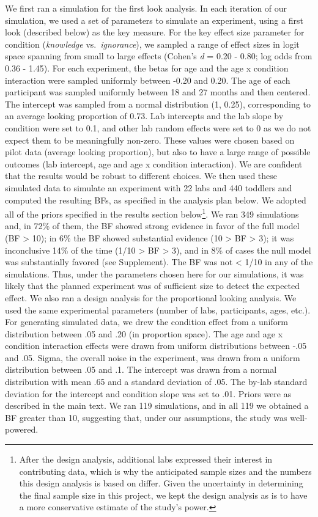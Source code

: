 \documentclass[
  man,floatsintext]{apa6}
\begin{document}
We first ran a simulation for the first look analysis. In each iteration of our simulation, we used a set of parameters to simulate an experiment, using a first look (described below) as the key measure. For the key effect size parameter for condition (\emph{knowledge} vs.~\emph{ignorance}), we sampled a range of effect sizes in logit space spanning from small to large effects (Cohen's \emph{d} = 0.20 - 0.80; log odds from 0.36 - 1.45). For each experiment, the betas for age and the age x condition interaction were sampled uniformly between -0.20 and 0.20. The age of each participant was sampled uniformly between 18 and 27 months and then centered. The intercept was sampled from a normal distribution (1, 0.25), corresponding to an average looking proportion of 0.73. Lab intercepts and the lab slope by condition were set to 0.1, and other lab random effects were set to 0 as we do not expect them to be meaningfully non-zero. These values were chosen based on pilot data (average looking proportion), but also to have a large range of possible outcomes (lab intercept, age and age x condition interaction). We are confident that the results would be robust to different choices. We then used these simulated data to simulate an experiment with 22 labs and 440 toddlers and computed the resulting BFs, as specified in the analysis plan below. We adopted all of the priors specified in the results section below\footnote{After the design analysis, additional labs expressed their interest in contributing data, which is why the anticipated sample sizes and the numbers this design analysis is based on differ. Given the uncertainty in determining the final sample size in this project, we kept the design analysis as is to have a more conservative estimate of the study's power.}. We ran 349 simulations and, in 72\% of them, the BF showed strong evidence in favor of the full model (BF \textgreater{} 10); in 6\% the BF showed substantial evidence (10 \textgreater{} BF \textgreater{} 3); it was inconclusive 14\% of the time (1/10 \textgreater{} BF \textgreater{} 3), and in 8\% of cases the null model was substantially favored (see Supplement). The BF was not \textless{} 1/10 in any of the simulations. Thus, under the parameters chosen here for our simulations, it was likely that the planned experiment was of sufficient size to detect the expected effect.
We also ran a design analysis for the proportional looking analysis. We used the same experimental parameters (number of labs, participants, ages, etc.). For generating simulated data, we drew the condition effect from a uniform distribution between .05 and .20 (in proportion space). The age and age x condition interaction effects were drawn from uniform distributions between -.05 and .05. Sigma, the overall noise in the experiment, was drawn from a uniform distribution between .05 and .1. The intercept was drawn from a normal distribution with mean .65 and a standard deviation of .05. The by-lab standard deviation for the intercept and condition slope was set to .01. Priors were as described in the main text. We ran 119 simulations, and in all 119 we obtained a BF greater than 10, suggesting that, under our assumptions, the study was well-powered.
\end{document}
